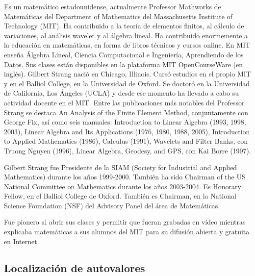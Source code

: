 \bigskip
{}
\begin{parchment} {Es un matemático estadounidense, actualmente Professor Mathworks de Matemáticas del Department of Mathematics del Massachusetts Institute of Technology (MIT). Ha contribuido a la teoría de elementos finitos, al cálculo de variaciones, al análisis wavelet y al  álgebra lineal. Ha contribuido enormemente a la educación en matemáticas, en forma de libros técnicos y cursos online. En MIT enseña Álgebra Lineal, Ciencia Computacional e Ingeniería, Aprendiendo de los Datos. Sus clases están disponibles en la plataforma MIT OpenCourseWare (en inglés).
Gilbert Strang nació en Chicago, Illinois. Cursó estudios en el propio MIT y en el Balliol College, en la Universidad de Oxford. Se doctoró en la Universidad de California, Los Ángeles (UCLA) y desde ese momento ha llevado a cabo su actividad docente en el MIT. Entre las publicaciones más notables del Professor Strang se destaca An Analysis of the Finite Element Method, conjuntamente con George Fix, así como seis manuales:
Introduction to Linear Algebra (1993, 1998, 2003),
Linear Algebra and Its Applications (1976, 1980, 1988, 2005),
Introduction to Applied Mathematics (1986),
Calculus (1991),
Wavelets and Filter Banks, con Truong Nguyen (1996),
Linear Algebra, Geodesy, and GPS, con Kai Borre (1997).

Gilbert Strang fue Presidente de la SIAM (Society for Industrial and Applied Mathematics) durante los años 1999-2000. También ha sido Chairman of the US National Committee on Mathematics durante los años 2003-2004. Es Honorary Fellow, en el Balliol College de Oxford. También es Chairman, en la National Science Foundation (NSF) del Advisory Panel del área de Matemáticas.

Fue pionero al abrir sus clases y permitir que fueran grabadas en vídeo mientras explicaba matemáticas a sus alumnos del MIT para su difusión abierta y gratuita en Internet. \cite{gstrang}}
\end{parchment}



\bigskip



\subsection{Localización de autovalores}

\bigskip

